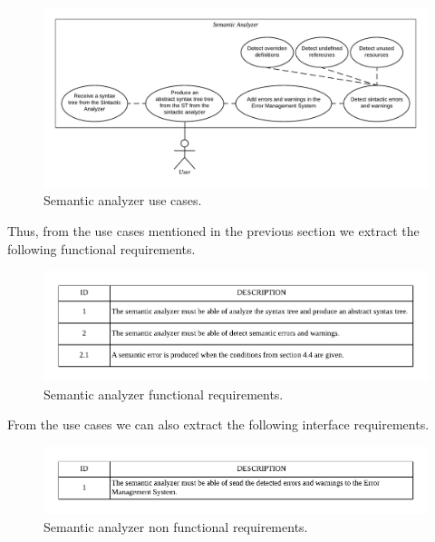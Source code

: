 \begin{figure}[h!]
    \includegraphics[scale=0.6]{images/sema-use-case.pdf}
    \centering
    \caption[Semantic analyzer use cases]{Semantic analyzer use cases.}
    \label{fig:sema-use-case}
\end{figure}

Thus, from the use cases mentioned in the previous section we
extract the following functional requirements.

\begin{figure}[h!]
    \includegraphics[width=\textwidth]{images/sema-reqf.pdf}
    \centering
    \caption[Semantic analyzer functional requirements]{Semantic analyzer functional requirements.}
    \label{fig:sema-reqf}
\end{figure}

From the use cases we can also extract the following interface requirements.

\begin{figure}[h!]
    \includegraphics[width=\textwidth]{images/sema-reqnf.pdf}
    \centering
    \caption[Semantic analyzer non functional requirements]{Semantic analyzer non functional requirements.}
    \label{fig:sema-reqnf}
\end{figure}

